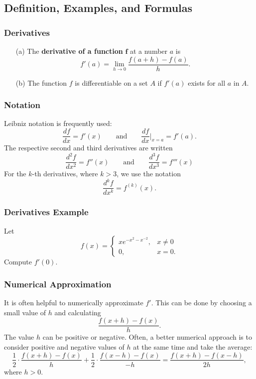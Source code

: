 \documentclass{beamer}
\begin{document}
\subsection{Definition, Examples, and Formulas}
\begin{frame}
\begin{Definition}
\frametitle{Derivatives}
\begin{enumerate}
\item[(a)] The {\bf derivative of a function} $\boldsymbol f$ at a number $a$ is
$$
f' (a) = \lim_{h\to 0}\frac{f(a + h) - f(a)}{h}.
$$
\item[(b)] The function $f$ is differentiable on a set $A$ if $f'(a)$ exists for all $a$ in $A$.
\end{enumerate}
\end{Definition} 
\end{frame}

\begin{frame}
\frametitle{Notation}
Leibniz notation is frequently used:
$$
\frac{d f}{dx} = f'(x)\qquad\text{and}\qquad \frac{d f}{dx}\Big|_{x = a} = f'(a).
$$
The respective second and third derivatives are written
$$
\frac{d^2 f}{dx^2} = f''(x)\qquad\text{and}\qquad \frac{d^3 f}{dx^3} = f'''(x)
$$
For the $k$-th derivatives, where $k > 3$, we use the notation
$$
\frac{d^k f}{dx^k} = f^{(k)}(x).
$$
\end{frame}

\begin{frame}[t]
\frametitle{Derivatives Example}
\small
\begin{Example}
Let
$$
f(x) = \begin{cases} x e^{-x^2 - x^{-2}}, & x \neq 0\\ 0,	& x= 0.\end{cases}
$$
Compute $f' (0)$.
\end{Example}
\end{frame}

\begin{frame}
\frametitle{Numerical Approximation}
It is often helpful to numerically approximate $f'$. This can be done by choosing a small value of $h$ and calculating
$$
\frac{f(x + h) - f(x)}{h}.
$$ 
The value $h$ can be positive or negative. Often, a better numerical approach is to consider positive and negative values of $h$ at the same time and take the average:
$$
\frac{1}{2}\cdot \frac{f(x + h) - f(x)}{h} + \frac{1}{2}\cdot \frac{f(x - h) - f(x)}{-h} = \frac{f(x + h) - f(x - h)}{2 h},
$$
where $h > 0$.
\end{frame}
\end{document}
